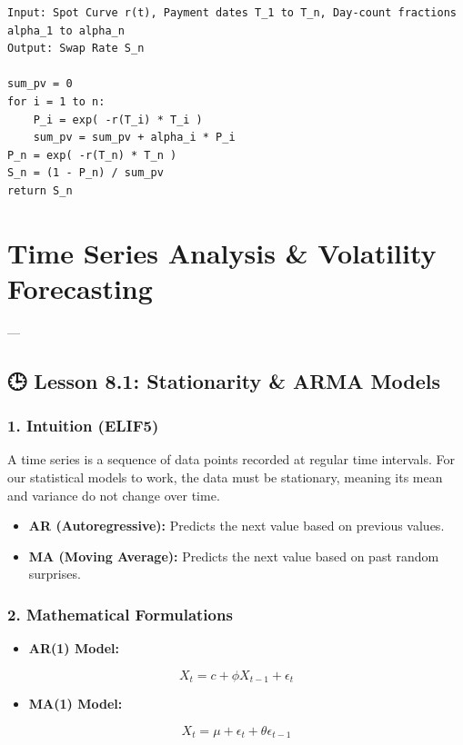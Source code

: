 \documentclass[11pt,oneside]{book}
\begin{document}
\begin{tcolorbox}[colback=white,colframe=black,boxrule=0.6pt,arc=0mm,title=Swap Rate Valuation]
\begin{verbatim}
Input: Spot Curve r(t), Payment dates T_1 to T_n, Day-count fractions alpha_1 to alpha_n
Output: Swap Rate S_n

sum_pv = 0
for i = 1 to n:
    P_i = exp( -r(T_i) * T_i )
    sum_pv = sum_pv + alpha_i * P_i
P_n = exp( -r(T_n) * T_n )
S_n = (1 - P_n) / sum_pv
return S_n
\end{verbatim}
\end{tcolorbox}


\newpage

\chapter{Time Series Analysis & Volatility Forecasting}

---

\section{🕒 Lesson 8.1: Stationarity \& ARMA Models}

\subsection{1. Intuition (ELIF5)}
A time series is a sequence of data points recorded at regular time intervals. For our statistical models to work, the data must be stationary, meaning its mean and variance do not change over time. 
\begin{itemize}
  \item \textbf{AR (Autoregressive):} Predicts the next value based on previous values.
  \item \textbf{MA (Moving Average):} Predicts the next value based on past random surprises.
\end{itemize}

\subsection{2. Mathematical Formulations}
\begin{itemize}
  \item \textbf{AR(1) Model:}
\end{itemize}
  $$X_t = c + \phi X_{t-1} + \epsilon_t$$
\begin{itemize}
  \item \textbf{MA(1) Model:}
\end{itemize}
  $$X_t = \mu + \epsilon_t + \theta \epsilon_{t-1}$$
\end{document}
